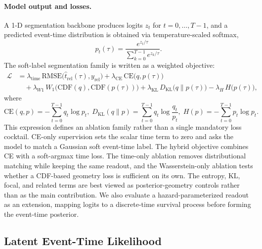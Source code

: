 \documentclass[12pt]{article}
\begin{document}
\paragraph{Model output and losses.}
A 1-D segmentation backbone produces logits $z_t$ for $t=0,\dots,T-1$, and a predicted
event-time distribution is obtained via temperature-scaled softmax,
\begin{equation}
\label{eq:rt_pred_dist}
p_t(\tau)=\frac{e^{z_t/\tau}}{\sum_{k=0}^{T-1} e^{z_k/\tau}}.
\end{equation}
The soft-label segmentation family is written as a weighted objective:
\begin{equation}
\label{eq:rt_loss}
\begin{aligned}
\mathcal{L}
&= \lambda_{\text{time}}\,\mathrm{RMSE}\big(\hat t_{\mathrm{rel}}(\tau), y_{\mathrm{rel}}\big)
 + \lambda_{\text{CE}}\,\mathrm{CE}\big(q, p(\tau)\big) \\
&\quad + \lambda_{W1}\,W_1\big(\mathrm{CDF}(q), \mathrm{CDF}(p(\tau))\big)
 + \lambda_{\text{KL}}\,D_{\mathrm{KL}}\big(q\|p(\tau)\big)
 - \lambda_{H}\,H\big(p(\tau)\big),
\end{aligned}
\end{equation}
where  
\begin{equation*}
\mathrm{CE}(q,p)=-\sum_{t=0}^{T-1} q_t \log p_t, \;
D_{\mathrm{KL}}(q\|p)=\sum_{t=0}^{T-1} q_t \log\frac{q_t}{p_t}, \;
H(p)=-\sum_{t=0}^{T-1} p_t \log p_t.
\end{equation*}
This expression defines an ablation family rather than a single mandatory loss cocktail. CE-only supervision sets the scalar time term to zero and asks the model to match a Gaussian soft event-time label. The hybrid objective combines CE with a soft-argmax time loss. The time-only ablation removes distributional matching while keeping the same readout, and the Wasserstein-only ablation tests whether a CDF-based geometry loss is sufficient on its own. The entropy, KL, focal, and related terms are best viewed as posterior-geometry controls rather than as the main contribution. We also evaluate a hazard-parameterized readout as an extension, mapping logits to a discrete-time survival process before forming the event-time posterior.

\subsection{Latent Event-Time Likelihood}
\label{sec:event_nll}
\end{document}
